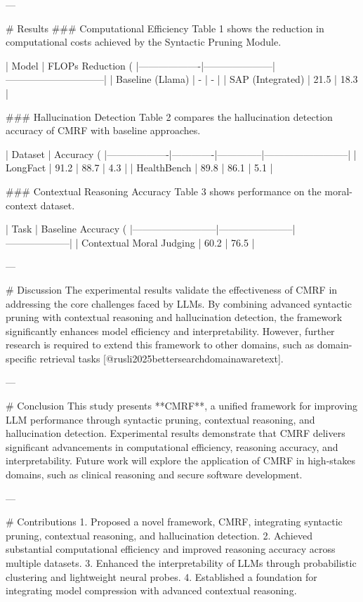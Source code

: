 ---

# Results
### Computational Efficiency
Table 1 shows the reduction in computational costs achieved by the Syntactic Pruning Module.

| Model            | FLOPs Reduction (%
|-------------------|---------------------|------------------------------|
| Baseline (Llama) | -                   | -                            |
| SAP (Integrated) | 21.5                | 18.3                         |

### Hallucination Detection
Table 2 compares the hallucination detection accuracy of CMRF with baseline approaches.

| Dataset          | Accuracy (%
|-------------------|-------------|--------------|--------------------------|
| LongFact          | 91.2        | 88.7         | 4.3                      |
| HealthBench       | 89.8        | 86.1         | 5.1                      |

### Contextual Reasoning Accuracy
Table 3 shows performance on the moral-context dataset.

| Task                     | Baseline Accuracy (%
|--------------------------|-----------------------|--------------------|
| Contextual Moral Judging | 60.2                 | 76.5              |

---

# Discussion
The experimental results validate the effectiveness of CMRF in addressing the core challenges faced by LLMs. By combining advanced syntactic pruning with contextual reasoning and hallucination detection, the framework significantly enhances model efficiency and interpretability. However, further research is required to extend this framework to other domains, such as domain-specific retrieval tasks [@rusli2025bettersearchdomainawaretext].

---

# Conclusion
This study presents **CMRF**, a unified framework for improving LLM performance through syntactic pruning, contextual reasoning, and hallucination detection. Experimental results demonstrate that CMRF delivers significant advancements in computational efficiency, reasoning accuracy, and interpretability. Future work will explore the application of CMRF in high-stakes domains, such as clinical reasoning and secure software development.

---

# Contributions
1. Proposed a novel framework, CMRF, integrating syntactic pruning, contextual reasoning, and hallucination detection.
2. Achieved substantial computational efficiency and improved reasoning accuracy across multiple datasets.
3. Enhanced the interpretability of LLMs through probabilistic clustering and lightweight neural probes.
4. Established a foundation for integrating model compression with advanced contextual reasoning.

